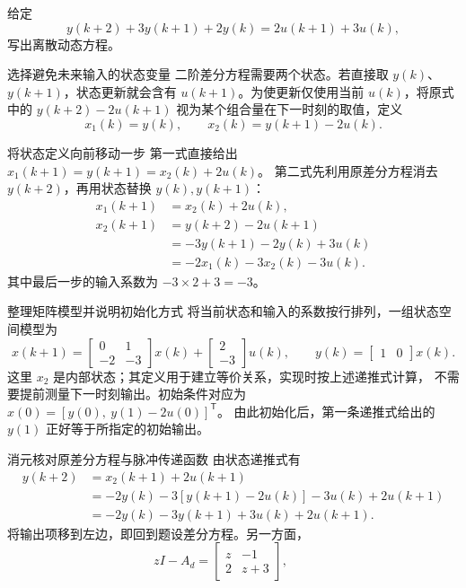 \documentclass[11pt]{article}
\begin{document}
\begin{problem}[原题 15：差分方程的离散状态空间模型]
给定
\[
y(k+2)+3y(k+1)+2y(k)=2u(k+1)+3u(k),
\]
写出离散动态方程。
\end{problem}
\begin{solution}
\begin{proofstep}{选择避免未来输入的状态变量}
二阶差分方程需要两个状态。若直接取 $y(k)$、$y(k+1)$，状态更新就会含有
$u(k+1)$。为使更新仅使用当前 $u(k)$，将原式中的
$y(k+2)-2u(k+1)$ 视为某个组合量在下一时刻的取值，定义
\[
x_1(k)=y(k),\qquad x_2(k)=y(k+1)-2u(k).
\]
\end{proofstep}
\begin{proofstep}{将状态定义向前移动一步}
第一式直接给出 $x_1(k+1)=y(k+1)=x_2(k)+2u(k)$。
第二式先利用原差分方程消去 $y(k+2)$，再用状态替换 $y(k),y(k+1)$：
\begin{align*}
x_1(k+1)&=x_2(k)+2u(k),\\
x_2(k+1)&=y(k+2)-2u(k+1)\\
&=-3y(k+1)-2y(k)+3u(k)\\
&=-2x_1(k)-3x_2(k)-3u(k).
\end{align*}
其中最后一步的输入系数为 $-3\times2+3=-3$。
\end{proofstep}
\begin{proofstep}{整理矩阵模型并说明初始化方式}
将当前状态和输入的系数按行排列，一组状态空间模型为
\[
\boxed{x(k+1)=\begin{bmatrix}0&1\\-2&-3\end{bmatrix}x(k)+
\begin{bmatrix}2\\-3\end{bmatrix}u(k),\qquad
y(k)=\begin{bmatrix}1&0\end{bmatrix}x(k).}
\]
这里 $x_2$ 是内部状态；其定义用于建立等价关系，实现时按上述递推式计算，
不需要提前测量下一时刻输出。初始条件对应为
$x(0)=[y(0),\ y(1)-2u(0)]^{\mathsf T}$。
由此初始化后，第一条递推式给出的 $y(1)$ 正好等于所指定的初始输出。
\end{proofstep}
\begin{proofstep}{消元核对原差分方程与脉冲传递函数}
由状态递推式有
\begin{align*}
y(k+2)&=x_2(k+1)+2u(k+1)\\
&=-2y(k)-3[y(k+1)-2u(k)]-3u(k)+2u(k+1)\\
&=-2y(k)-3y(k+1)+3u(k)+2u(k+1).
\end{align*}
将输出项移到左边，即回到题设差分方程。另一方面，
\[
zI-A_d=\begin{bmatrix}z&-1\\2&z+3\end{bmatrix},\qquad
\]
\end{proofstep}
\end{solution}
\end{document}

